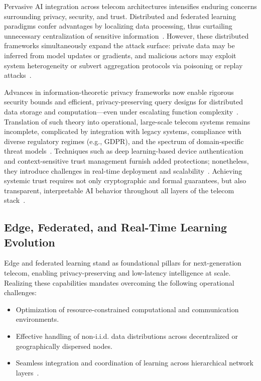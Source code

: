 Pervasive AI integration across telecom architectures intensifies enduring concerns surrounding privacy, security, and trust. Distributed and federated learning paradigms confer advantages by localizing data processing, thus curtailing unnecessary centralization of sensitive information~\cite{ref17,ref18,ref19,ref23,ref24,ref26,ref48}. However, these distributed frameworks simultaneously expand the attack surface: private data may be inferred from model updates or gradients, and malicious actors may exploit system heterogeneity or subvert aggregation protocols via poisoning or replay attacks~\cite{ref10,ref20,ref21,ref23}.

Advances in information-theoretic privacy frameworks now enable rigorous security bounds and efficient, privacy-preserving query designs for distributed data storage and computation—even under escalating function complexity~\cite{ref48}. Translation of such theory into operational, large-scale telecom systems remains incomplete, complicated by integration with legacy systems, compliance with diverse regulatory regimes (e.g., GDPR), and the spectrum of domain-specific threat models~\cite{ref10,ref24,ref49}. Techniques such as deep learning-based device authentication and context-sensitive trust management furnish added protections; nonetheless, they introduce challenges in real-time deployment and scalability~\cite{ref18,ref23}. Achieving systemic trust requires not only cryptographic and formal guarantees, but also transparent, interpretable AI behavior throughout all layers of the telecom stack~\cite{ref19,ref26,ref49}.

\subsection{Edge, Federated, and Real-Time Learning Evolution}

Edge and federated learning stand as foundational pillars for next-generation telecom, enabling privacy-preserving and low-latency intelligence at scale. Realizing these capabilities mandates overcoming the following operational challenges:
\begin{itemize}
    \item Optimization of resource-constrained computational and communication environments.
    \item Effective handling of non-i.i.d. data distributions across decentralized or geographically dispersed nodes.
    \item Seamless integration and coordination of learning across hierarchical network layers~\cite{ref17,ref19,ref23,ref25,ref26,ref39,ref42,ref48}.
\end{itemize}

